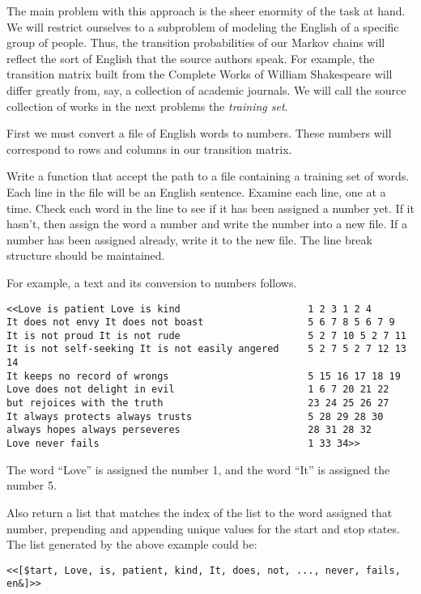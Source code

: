 The main problem with this approach is the sheer enormity of the task at hand.
We will restrict ourselves to a subproblem of modeling the English of a specific group of people.
Thus, the transition probabilities of our Markov chains will reflect the sort of English that the source authors speak.
For example, the transition matrix built from the Complete Works of William Shakespeare will differ greatly from, say, a collection of academic journals.
We will call the source collection of works in the next problems the \emph{training set}.

\begin{problem}
First we must convert a file of English words to numbers.
These numbers will correspond to rows and columns in our transition matrix.

Write a function that accept the path to a file containing a training set of words.
Each line in the file will be an English sentence.
Examine each line, one at a time.
Check each word in the line to see if it has been assigned a number yet.
If it hasn't, then assign the word a number and write the number into a new file.
If a number has been assigned already, write it to the new file.
The line break structure should be maintained.

For example, a text and its conversion to numbers follows.

\begin{lstlisting}
<<Love is patient Love is kind 						1 2 3 1 2 4 
It does not envy It does not boast 					5 6 7 8 5 6 7 9 
It is not proud It is not rude 						5 2 7 10 5 2 7 11 
It is not self-seeking It is not easily angered  	5 2 7 5 2 7 12 13 14 
It keeps no record of wrongs						5 15 16 17 18 19 
Love does not delight in evil						1 6 7 20 21 22 
but rejoices with the truth 						23 24 25 26 27 
It always protects always trusts 					5 28 29 28 30 
always hopes always perseveres 						28 31 28 32
Love never fails 									1 33 34>>
\end{lstlisting}

The word ``Love'' is assigned the number 1, and the word ``It'' is assigned the number 5.

Also return a list that matches the index of the list to the word assigned that number, prepending and appending unique values for the start and stop states.
The list generated by the above example could be:
\begin{lstlisting}
<<[$tart, Love, is, patient, kind, It, does, not, ..., never, fails, en&]>>
\end{lstlisting}
\label{problem:str_to_int}
\end{problem}

